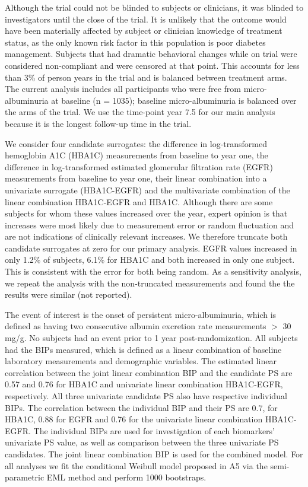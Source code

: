 \documentclass[times, doublespace]{simauth}
\begin{document}
Although the trial could not be blinded to subjects or clinicians, it was blinded to investigators until the close of the trial. It is unlikely that the outcome would have been materially affected by subject or clinician knowledge of treatment status, as the only known risk factor in this population is poor diabetes management. Subjects that had dramatic behavioral changes while on trial were considered non-compliant and were censored at that point. This accounts for less than 3\% of person years in the trial and is balanced between treatment arms. The current analysis includes all participants who were free from micro-albuminuria at baseline (n = 1035); baseline micro-albuminuria is balanced over the arms of the trial. We use the time-point year 7.5 for our main analysis because it is the longest follow-up time in the trial.

We consider four candidate surrogates: the difference in log-transformed hemoglobin A1C (HBA1C) measurements from baseline to year one, the difference in log-transformed estimated glomerular filtration rate (EGFR) measurements from baseline to year one, their linear combination into a univariate surrogate (HBA1C-EGFR) and the multivariate combination of the linear combination HBA1C-EGFR and HBA1C. Although there are some subjects for whom these values increased over the year, expert opinion is that increases were most likely due to measurement error or random fluctuation and are not indications of clinically relevant increases. We therefore truncate both candidate surrogates at zero for our primary analysis. EGFR values increased in only 1.2\% of subjects, 6.1\% for HBA1C and both increased in only one subject. This is consistent with the error for both being random. As a sensitivity analysis, we repeat the analysis with the non-truncated measurements and found the the results were similar (not reported). 

The event of interest is the onset of persistent micro-albuminuria, which is defined as having two consecutive albumin excretion rate measurements $>$ 30 mg/g. No subjects had an event prior to 1 year post-randomization. All subjects had the BIPs measured, which is defined as a linear combination of baseline laboratory measurements and demographic variables. The estimated linear correlation between the joint linear combination BIP and the candidate PS are 0.57 and 0.76 for HBA1C and univariate linear combination HBA1C-EGFR, respectively. All three univariate candidate PS also have respective individual BIPs. The correlation between the individual BIP and their PS are 0.7, for HBA1C, 0.88 for EGFR and 0.76 for the univariate linear combination HBA1C-EGFR. The individual BIPs are used for investigation of each biomarkers' univariate PS value, as well as comparison between the three univariate PS candidates. The joint linear combination BIP is used for the combined model. For all analyses we fit the conditional Weibull model proposed in A5 via the semi-parametric EML method and perform 1000 bootstraps. 
\end{document}
